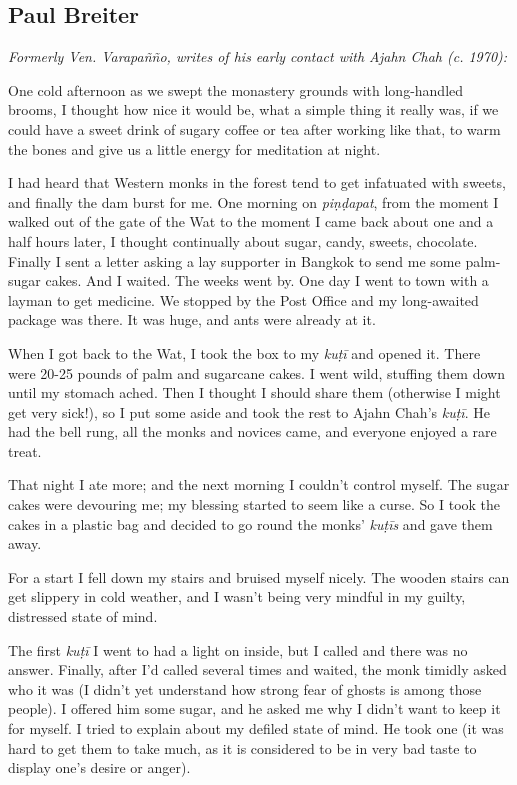 
\subsection{Paul Breiter}

\emph{Formerly Ven. Varapañño, writes of his early contact with Ajahn Chah (c. 1970):}

One cold afternoon as we swept the monastery grounds with long-handled
brooms, I thought how nice it would be, what a simple thing it really
was, if we could have a sweet drink of sugary coffee or tea after
working like that, to warm the bones and give us a little energy for
meditation at night. 

I had heard that Western monks in the forest tend to get infatuated with
sweets, and finally the dam burst for me. One morning on
\emph{piṇḍapat}, from the moment I walked out of the gate of the Wat to
the moment I came back about one and a half hours later, I thought
continually about sugar, candy, sweets, chocolate. Finally I sent a
letter asking a lay supporter in Bangkok to send me some palm-sugar
cakes. And I waited. The weeks went by. One day I went to town with a
layman to get medicine. We stopped by the Post Office and my
long-awaited package was there. It was huge, and ants were already at
it. 

When I got back to the Wat, I took the box to my \emph{kuṭī} and opened
it. There were 20-25 pounds of palm and sugarcane cakes. I went wild,
stuffing them down until my stomach ached. Then I thought I should share
them (otherwise I might get very sick!), so I put some aside and took
the rest to Ajahn Chah's \emph{kuṭī}. He had the bell rung, all the
monks and novices came, and everyone enjoyed a rare treat. 

That night I ate more; and the next morning I couldn't control myself. 
The sugar cakes were devouring me; my blessing started to seem like a
curse. So I took the cakes in a plastic bag and decided to go round the
monks' \emph{kuṭīs} and gave them away. 

For a start I fell down my stairs and bruised myself nicely. The wooden
stairs can get slippery in cold weather, and I wasn't being very mindful
in my guilty, distressed state of mind. 

The first \emph{kuṭī} I went to had a light on inside, but I called and
there was no answer. Finally, after I'd called several times and waited, 
the monk timidly asked who it was (I didn't yet understand how strong
fear of ghosts is among those people). I offered him some sugar, and he
asked me why I didn't want to keep it for myself. I tried to explain
about my defiled state of mind. He took one (it was hard to get them to
take much, as it is considered to be in very bad taste to display one's
desire or anger). 

